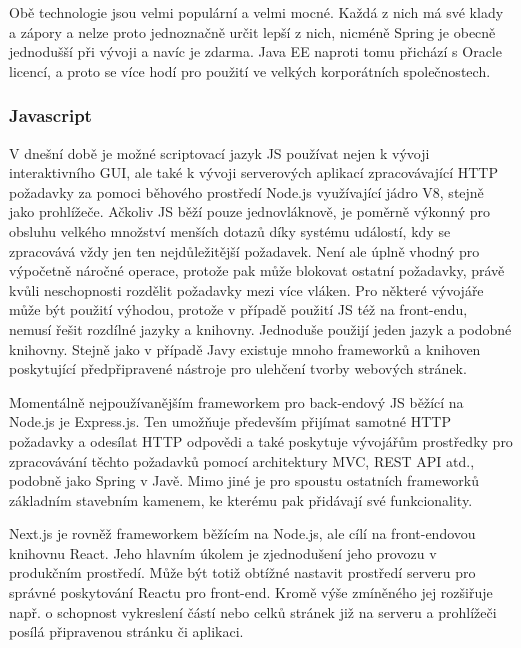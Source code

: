 		Obě technologie jsou velmi populární a velmi mocné.
		Každá z nich má své klady a zápory a nelze proto jednoznačně určit lepší z nich, nicméně Spring je obecně jednodušší při
		vývoji a navíc je zdarma.
		Java EE naproti tomu přichází s Oracle licencí, a proto se více hodí pro použití ve velkých korporátních
		společnostech. \cite{java_ee_vs_spring}

		\subsubsection{Javascript}

		V dnešní době je možné scriptovací jazyk \ac{JS} používat nejen k vývoji interaktivního \Ac{GUI},
		ale také k vývoji serverových aplikací zpracovávající \Ac{HTTP} požadavky za pomoci běhového prostředí Node.js
		využívající jádro V8, stejně jako prohlížeče. \cite{express_node_introduction}
		Ačkoliv \ac{JS} běží pouze jednovláknově, je poměrně výkonný pro obsluhu velkého množství menších dotazů díky
		systému událostí, kdy se zpracovává vždy jen ten nejdůležitější požadavek.
		Není ale úplně vhodný pro výpočetně náročné operace, protože pak může blokovat ostatní požadavky, právě kvůli
		neschopnosti rozdělit požadavky mezi více vláken. \cite{js_eventloop}
		Pro některé vývojáře může být použití výhodou, protože v případě použití \ac{JS} též na front-endu,
		nemusí řešit rozdílné jazyky a knihovny.
		Jednoduše použijí jeden jazyk a podobné knihovny.
		Stejně jako v případě Javy existuje mnoho frameworků a knihoven poskytující předpřipravené nástroje pro ulehčení
		tvorby webových stránek.

		Momentálně nejpoužívanějším frameworkem pro back-endový \ac{JS} běžící na Node.js je Express.js. \cite{state_of_js_2020}
		Ten umožňuje především přijímat samotné \Ac{HTTP} požadavky a odesílat \Ac{HTTP} odpovědi a také poskytuje vývojářům
		prostředky pro zpracovávání těchto požadavků pomocí architektury \Ac{MVC}, \Ac{REST} API atd., podobně
		jako Spring v Javě.
		Mimo jiné je pro spoustu ostatních frameworků základním stavebním kamenem, ke kterému pak přidávají
		své funkcionality. \cite{express_node_introduction}

		Next.js je rovněž frameworkem běžícím na Node.js, ale cílí na front-endovou knihovnu React.
		Jeho hlavním úkolem je zjednodušení jeho provozu v produkčním prostředí.
		Může být totiž obtížné nastavit prostředí serveru pro správné poskytování Reactu pro front-end.
		Kromě výše zmíněného jej rozšiřuje např. o schopnost vykreslení částí nebo celků stránek již na serveru a
		prohlížeči posílá připravenou stránku či aplikaci. \cite{create_nextjs_app}

